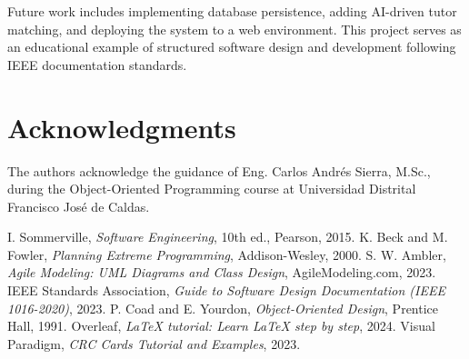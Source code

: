 \documentclass[conference]{IEEEtran}
\begin{document}
Future work includes implementing database persistence, adding AI-driven tutor matching, and deploying the system to a web environment. This project serves as an educational example of structured software design and development following IEEE documentation standards.

\section*{Acknowledgments}
The authors acknowledge the guidance of Eng. Carlos Andr\'es Sierra, M.Sc., during the Object-Oriented Programming course at Universidad Distrital Francisco Jos\'e de Caldas.

\begin{thebibliography}{00}
 I. Sommerville, \textit{Software Engineering}, 10th ed., Pearson, 2015.
 K. Beck and M. Fowler, \textit{Planning Extreme Programming}, Addison-Wesley, 2000.
 S. W. Ambler, \textit{Agile Modeling: UML Diagrams and Class Design}, AgileModeling.com, 2023.
 IEEE Standards Association, \textit{Guide to Software Design Documentation (IEEE 1016-2020)}, 2023.
 P. Coad and E. Yourdon, \textit{Object-Oriented Design}, Prentice Hall, 1991.
 Overleaf, \textit{LaTeX tutorial: Learn LaTeX step by step}, 2024.
 Visual Paradigm, \textit{CRC Cards Tutorial and Examples}, 2023.
\end{thebibliography}
\end{document}
